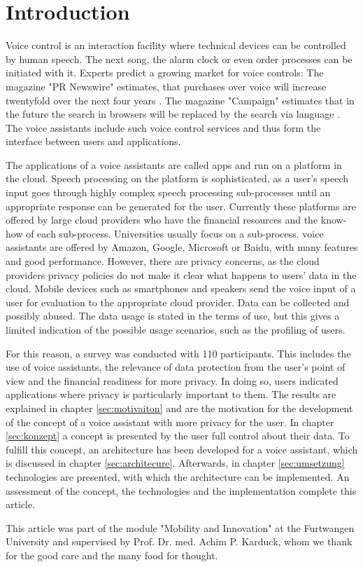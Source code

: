 \section{Introduction}
Voice control is an interaction facility where technical devices can be controlled by human speech. The next song, the alarm clock or even order processes can be initiated with it. Experts predict a growing market for voice controls: The magazine "PR Newswire" estimates, that purchases over voice will increase twentyfold over the next four years \cite{prNewswire}. The magazine "Campaign" estimates that in the future the search in browsers will be replaced by the search via language \cite{Campaign}. The voice assistants include such voice control services and thus form the interface between users and applications.

The applications of a voice assistants are called apps and run on a platform in the cloud. Speech processing on the platform is sophisticated, as a user's speech input goes through highly complex speech processing sub-processes until an appropriate response can be generated for the user. Currently these platforms are offered by large cloud providers who have the financial resources and the know-how of each sub-process. Universities usually focus on a sub-process. voice assistants are offered by Amazon, Google, Microsoft or Baidu, with many features and good performance. However, there are privacy concerns, as the cloud providers privacy policies do not make it clear what happens to users' data in the cloud. Mobile devices such as smartphones and speakers send the voice input of a user for evaluation to the appropriate cloud provider. Data can be collected and possibly abused. The data usage is stated in the terms of use, but this gives a limited indication of the possible usage scenarios, such as the profiling of users.

For this reason, a survey was conducted with 110 participants. This includes the use of voice assistants, the relevance of data protection from the user's point of view and the financial readiness for more privacy. In doing so, users indicated applications where privacy is particularly important to them. The results are explained in chapter \ref{sec:motivaiton} and are the motivation for the development of the concept of a voice assistant with more privacy for the user. In chapter \ref{sec:konzept} a concept is presented by the user full control about their data. To fulfill this concept, an architecture has been developed for a voice assistant, which is discussed in chapter \ref{sec:architecure}. Afterwards, in chapter \ref{sec:umsetzung} technologies are presented, with which the architecture can be implemented. An assessment of the concept, the technologies and the implementation complete this article. \newline

This article was part of the module "Mobility and Innovation" at the Furtwangen University  and supervised by Prof. Dr. med. Achim P. Karduck, whom we thank for the good care and the many food for thought.
